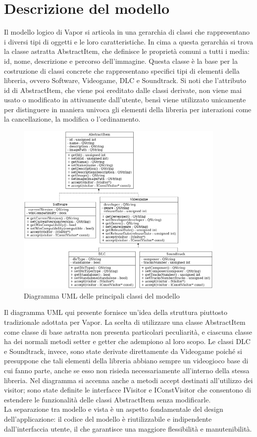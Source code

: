 \documentclass[10pt]{article}
\begin{document}
\section{Descrizione del modello}
Il modello logico di Vapor si articola in una gerarchia di classi che rappresentano i diversi tipi di oggetti e le loro caratteristiche. In cima a questa gerarchia si trova la classe astratta AbstractItem, che definisce le proprietà comuni a tutti i media: id, nome, descrizione e percorso dell'immagine. Questa classe è la base per la costruzione di classi concrete che rappresentano specifici tipi di elementi della libreria, ovvero Software, Videogame, DLC e Soundtrack. Si noti che l'attributo id di AbstractItem, che viene poi ereditato dalle classi derivate, non viene mai usato o modificato in attivamente dall'utente, bensì viene utilizzato unicamente per distinguere in maniera univoca gli elementi della libreria per interazioni come la cancellazione, la modifica o l'ordinamento.
\begin{figure} [h]
    \centering
    \includegraphics[width=0.9\textwidth]{./uml_diagram.png}
    \caption{Diagramma UML delle principali classi del modello}
\end{figure}
Il diagramma UML qui presente fornisce un'idea della struttura piuttosto tradizionale adottata per Vapor.
La scelta di utilizzare una classe AbstractItem come classe di base astratta non presenta particolari peculiarità, e ciascuna classe ha dei normali metodi setter e getter che adempiono al loro scopo. Le classi DLC e Soundtrack, invece, sono state derivate direttamente da Videogame poiché si presuppone che tali elementi della libreria abbiano sempre un videogioco base di cui fanno parte, anche se esso non risieda necessariamente all'interno della stessa libreria. Nel diagramma si accenna anche a metodi accept destinati all'utilizzo dei visitor; sono state definite le interfacce IVisitor e IConstVisitor che consentono di estendere le funzionalità delle classi AbstractItem senza modificarle.
\\La separazione tra modello e vista è un aspetto fondamentale del design dell'applicazione: il codice del modello è riutilizzabile e indipendente dall'interfaccia utente, il che garantisce una maggiore flessibilità e manutenibilità.
\end{document}
